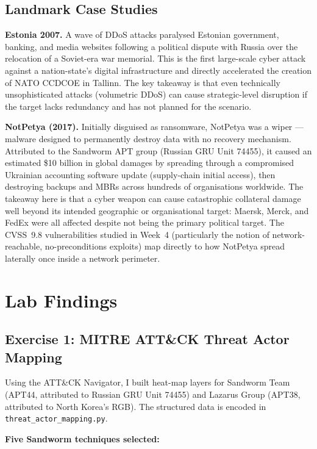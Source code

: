 \documentclass[11pt,a4paper]{article}
\begin{document}
\subsection{Landmark Case Studies}

\textbf{Estonia 2007.} A wave of DDoS attacks paralysed Estonian government,
banking, and media websites following a political dispute with Russia over the
relocation of a Soviet-era war memorial. This is the first large-scale cyber
attack against a nation-state's digital infrastructure and directly accelerated
the creation of NATO CCDCOE in Tallinn. The key takeaway is that even
technically unsophisticated attacks (volumetric DDoS) can cause strategic-level
disruption if the target lacks redundancy and has not planned for the scenario.

\textbf{NotPetya (2017).} Initially disguised as ransomware, NotPetya was a
wiper --- malware designed to permanently destroy data with no recovery
mechanism. Attributed to the Sandworm APT group (Russian GRU Unit 74455), it
caused an estimated \$10 billion in global damages by spreading through a
compromised Ukrainian accounting software update (supply-chain initial access),
then destroying backups and MBRs across hundreds of organisations worldwide.
The takeaway here is that a cyber weapon can cause catastrophic collateral
damage well beyond its intended geographic or organisational target: Maersk,
Merck, and FedEx were all affected despite not being the primary political target.
The CVSS~9.8 vulnerabilities studied in Week~4 (particularly the notion of
network-reachable, no-preconditions exploits) map directly to how NotPetya spread
laterally once inside a network perimeter.


\section{Lab Findings}

\subsection{Exercise 1: MITRE ATT\&CK Threat Actor Mapping}

Using the ATT\&CK Navigator, I built heat-map layers for Sandworm Team (APT44,
attributed to Russian GRU Unit 74455) and Lazarus Group (APT38, attributed to
North Korea's RGB). The structured data is encoded in \texttt{threat\_actor\_mapping.py}.

\vspace{4pt}
\noindent\textbf{Five Sandworm techniques selected:}
\end{document}
